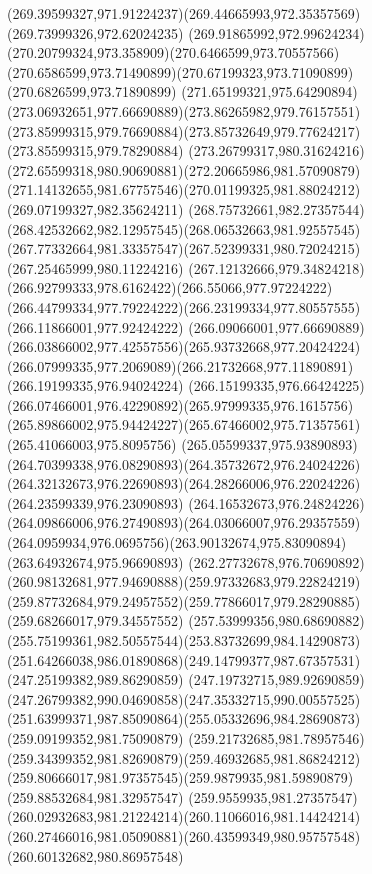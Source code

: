 {{		\curveto(269.39599327,971.91224237)(269.44665993,972.35357569)(269.73999326,972.62024235)
		\curveto(269.91865992,972.99624234)(270.20799324,973.358909)(270.6466599,973.70557566)
		\curveto(270.6586599,973.71490899)(270.67199323,973.71090899)(270.6826599,973.71890899)
		\curveto(271.65199321,975.64290894)(273.06932651,977.66690889)(273.86265982,979.76157551)
		\curveto(273.85999315,979.76690884)(273.85732649,979.77624217)(273.85599315,979.78290884)
		\curveto(273.26799317,980.31624216)(272.65599318,980.90690881)(272.20665986,981.57090879)
		\curveto(271.14132655,981.67757546)(270.01199325,981.88024212)(269.07199327,982.35624211)
		\curveto(268.75732661,982.27357544)(268.42532662,982.12957545)(268.06532663,981.92557545)
		\curveto(267.77332664,981.33357547)(267.52399331,980.72024215)(267.25465999,980.11224216)
		\curveto(267.12132666,979.34824218)(266.92799333,978.6162422)(266.55066,977.97224222)
		\curveto(266.44799334,977.79224222)(266.23199334,977.80557555)(266.11866001,977.92424222)
		\curveto(266.09066001,977.66690889)(266.03866002,977.42557556)(265.93732668,977.20424224)
		\curveto(266.07999335,977.2069089)(266.21732668,977.11890891)(266.19199335,976.94024224)
		\curveto(266.15199335,976.66424225)(266.07466001,976.42290892)(265.97999335,976.1615756)
		\curveto(265.89866002,975.94424227)(265.67466002,975.71357561)(265.41066003,975.8095756)
		\curveto(265.05599337,975.93890893)(264.70399338,976.08290893)(264.35732672,976.24024226)
		\curveto(264.32132673,976.22690893)(264.28266006,976.22024226)(264.23599339,976.23090893)
		\curveto(264.16532673,976.24824226)(264.09866006,976.27490893)(264.03066007,976.29357559)
		\curveto(264.0959934,976.0695756)(263.90132674,975.83090894)(263.64932674,975.96690893)
		\curveto(262.27732678,976.70690892)(260.98132681,977.94690888)(259.97332683,979.22824219)
		\curveto(259.87732684,979.24957552)(259.77866017,979.28290885)(259.68266017,979.34557552)
		\curveto(257.53999356,980.68690882)(255.75199361,982.50557544)(253.83732699,984.14290873)
		\curveto(251.64266038,986.01890868)(249.14799377,987.67357531)(247.25199382,989.86290859)
		\curveto(247.19732715,989.92690859)(247.26799382,990.04690858)(247.35332715,990.00557525)
		\curveto(251.63999371,987.85090864)(255.05332696,984.28690873)(259.09199352,981.75090879)
		\curveto(259.21732685,981.78957546)(259.34399352,981.82690879)(259.46932685,981.86824212)
		\curveto(259.80666017,981.97357545)(259.9879935,981.59890879)(259.88532684,981.32957547)
		\curveto(259.9559935,981.27357547)(260.02932683,981.21224214)(260.11066016,981.14424214)
		\curveto(260.27466016,981.05090881)(260.43599349,980.95757548)(260.60132682,980.86957548)
}}
